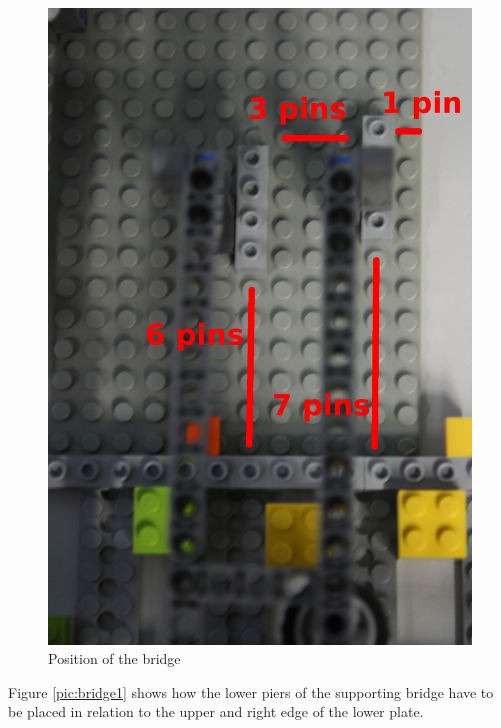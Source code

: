 \documentclass[%
  a4paper,%
  11pt,%
  blue,%
  hyperref	%
  ]{tubsartcl}
\begin{document}
\begin{figure}[!htb]
\begin{center}
\includegraphics[scale=0.35]{graphics_lego/bridge2.jpg}
\end{center}
\caption{Position of the bridge}
\label{pic:bridge2}
\end{figure}

\clearpage

Figure \ref{pic:bridge1} shows how the lower piers of the supporting bridge have to be placed in relation to the upper and right edge of the lower plate.
\end{document}

